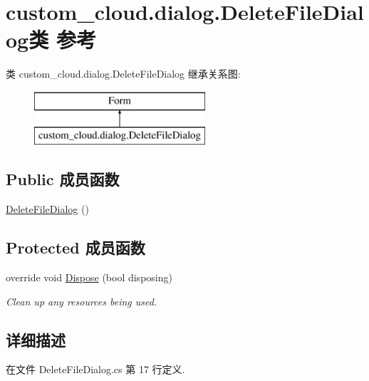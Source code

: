 \hypertarget{classcustom__cloud_1_1dialog_1_1_delete_file_dialog}{}\section{custom\+\_\+cloud.\+dialog.\+Delete\+File\+Dialog类 参考}
\label{classcustom__cloud_1_1dialog_1_1_delete_file_dialog}
类 custom\+\_\+cloud.\+dialog.\+Delete\+File\+Dialog 继承关系图\+:\begin{figure}[H]
\begin{center}
\leavevmode
\includegraphics[height=2.000000cm]{classcustom__cloud_1_1dialog_1_1_delete_file_dialog}
\end{center}
\end{figure}
\subsection*{Public 成员函数}
\begin{DoxyCompactItemize}
\item 
\hyperlink{classcustom__cloud_1_1dialog_1_1_delete_file_dialog_aaddc84f5129322954a51824bf3a6f71a}{Delete\+File\+Dialog} ()
\end{DoxyCompactItemize}
\subsection*{Protected 成员函数}
\begin{DoxyCompactItemize}
\item 
override void \hyperlink{classcustom__cloud_1_1dialog_1_1_delete_file_dialog_ae175a54bea6b9273a06c9d17f3c7bac6}{Dispose} (bool disposing)
\begin{DoxyCompactList}\small\item\em Clean up any resources being used. \end{DoxyCompactList}\end{DoxyCompactItemize}


\subsection{详细描述}


在文件 Delete\+File\+Dialog.\+cs 第 17 行定义.



